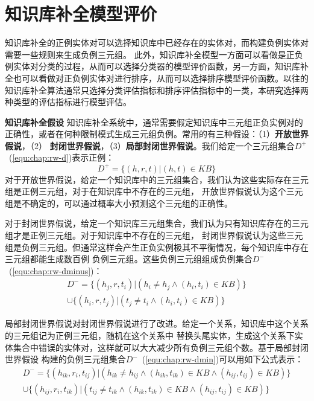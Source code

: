 \section{知识库补全模型评价}
知识库补全的正例实体对可以选择知识库中已经存在的实体对，而构建负例实体对需要一些规则来生成负例三元组。
此外，知识库补全模型一方面可以看做是正负例实体对分类的过程，从而可以选择分类器的模型评价函数，另一方面，知识库补全也可以看做对正负例实体对进行排序，从而可以选择排序模型评价函数。以往的知识库补全算法通常只选择分类评估指标和排序评估指标中的一类，本研究选择两种类型的评估指标进行模型评估。

\textbf{知识库补全假设} 知识库补全系统中，通常需要假定知识库中三元组正负实例对的正确性，或者在何种限制模式生成三元组负例。常用的有三种假设：（1）\textbf{开放世界假说}，（2）
\textbf{封闭世界假说}，（3）\textbf{局部封闭世界假说}。我们给定一个三元组集合$D^+$~(\ref{equ:chap:rw-d})表示正例：
\begin{equation}
\label{equ:chap:rw-d}
D^+=\{(h,r,t)|(h,t) \in KB\}
\end{equation}
对于开放世界假说，给定一个知识库中的三元组集合，我们认为这些实际存在三元组是正例三元组，对于在知识库中不存在的三元组，
开放世界假说认为这个三元组是不确定的，可以通过概率大小预测这个三元组的正确性。

对于封闭世界假说，给定一个知识库三元组集合，我们认为只有知识库存在的三元组才是正例三元组。对于知识库中不存在的三元组，
封闭世界假说认为这些三元组是负例三元组。但通常这样会产生正负实例极其不平衡情况，每个知识库中存在三元组都能生成数百例
负例三元组。这些负例三元组组成负例集合$D^-$~(\ref{equ:chap:rw-dminus})：
\begin{equation}
\label{equ:chap:rw-dminus}
\begin{split}
D^-=\{(h_j,r,t_i)|(h_i \ne h_j \wedge (h_i,t_i) \in KB)\} \\
 \cup \{(h_i,r,t_j)|(t_j \ne t_i \wedge(h_i,t_i) \in KB)\}
 \end{split}
 \end{equation}

局部封闭世界假说对封闭世界假说进行了改进。给定一个关系，知识库中这个关系的三元组记为正例三元组，随机在这个关系中
替换头尾实体，生成这个关系下实体集合中错误的实体对，这样就可以大大减少所有负例三元组个数。基于局部封闭世界假设
构建的负例三元组集合$D^-$~(\ref{equ:chap:rw-dmin})可以用如下公式表示：
\begin{equation}
\label{equ:chap:rw-dmin}
\begin{split}
D^-=\{(h_{ik},r_i,t_{ij})|(h_{ik} \ne h_{ij} \wedge (h_{ik},t_{ik}) \in KB  \wedge (h_{ij},t_{ij}) \in KB)\} \\
 \cup \{(h_{ij},r_i,t_{ik})|(t_{ij} \ne t_{ik} \wedge(h_{ik},t_{ik}) \in KB \wedge(h_{ij},t_{ij}) \in KB)\}
 \end{split}
\end{equation}

